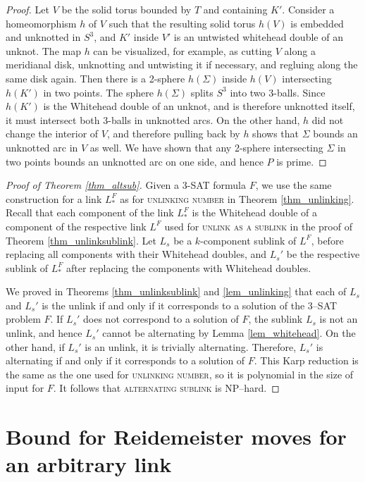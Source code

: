 \documentclass[12pt]{amsart}
\theoremstyle{definition}
\theoremstyle{remark}
\begin{document}
\begin{proof}
Let $V$ be the solid torus bounded by $T$ and containing $K'$.  Consider a homeomorphism $h$ of $V$ such that the resulting solid torus $h(V)$ is embedded and unknotted in $S^3$, and $K'$ inside $V'$ is an untwisted whitehead double of an unknot. The map $h$ can be visualized, for example, as cutting $V$ along a meridianal disk, unknotting and untwisting it if necessary, and regluing along the same disk again. Then there is a 2-sphere $h(\Sigma)$ inside $h(V)$ intersecting $h(K')$ in two points. The sphere $h(\Sigma)$ splits $S^3$ into two 3-balls. Since $h(K')$ is the Whitehead double of an unknot, and is therefore unknotted itself, it must intersect both 3-balls in unknotted arcs. On the other hand, $h$ did not change the interior of $V$, and therefore pulling back by $h$ shows that $\Sigma$ bounds an unknotted arc in $V$ as well.  We have shown that any 2-sphere intersecting $\Sigma$ in two points bounds an unknotted arc on one side, and hence $P$ is prime.
\end{proof}

\begin{proof}[Proof of Theorem \ref{thm_altsub}]
Given a 3-SAT formula $F$, we use the same construction for a link $L^F_*$ as for \textsc{unlinking number} in Theorem \ref{thm_unlinking}. Recall that each component of the link $L^F_*$ is the Whitehead double of a component of the respective link $L^F$ used for \textsc{unlink as a sublink} in the proof of Theorem \ref{thm_unlinksublink}.  Let $L_s$ be a $k$-component sublink of $L^F$, before replacing all components with their Whitehead doubles, and $L_s'$ be the respective sublink of $L^F_*$ after replacing the components with Whitehead doubles.

We proved in Theorems \ref{thm_unlinksublink} and \ref{lem_unlinking} that each of $L_s$ and $L_s'$ is the unlink if and only if it corresponds to a solution of the 3--\textsc{SAT} problem $F$.  If $L_s'$ does not correspond to a solution of $F$, the sublink $L_s$ is not an unlink, and hence $L_s'$ cannot be alternating by Lemma \ref{lem_whitehead}. On the other hand, if $L_s'$ is an unlink, it is trivially alternating.  Therefore, $L_s'$ is alternating if and only if it corresponds to a solution of $F$.  This Karp reduction is the same as the one used for \textsc{unlinking number}, so it is polynomial in the size of input for $F$.  It follows that \textsc{alternating sublink} is NP--hard.
\end{proof}

\section{Bound for Reidemeister moves for an arbitrary link}
\label{sec_reidbound}
\end{document}
